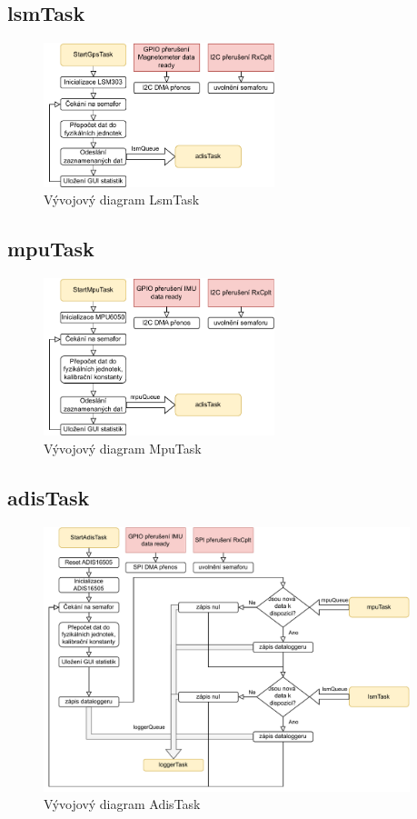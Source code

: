 \subsection{lsmTask}
\begin{figure}[h]
    \centering
    \includegraphics[width=0.6\textwidth]{obrazky/LsmTask}
    \caption{Vývojový diagram LsmTask}
\end{figure}
\subsection{mpuTask}
\begin{figure}[h]
    \centering
    \includegraphics[width=0.6\textwidth]{obrazky/MpuTask}
    \caption{Vývojový diagram MpuTask}
\end{figure}
\subsection{adisTask}
\begin{figure}[h]
    \centering
    \includegraphics[width=0.95\textwidth]{obrazky/AdisTask}
    \caption{Vývojový diagram AdisTask}
\end{figure}
